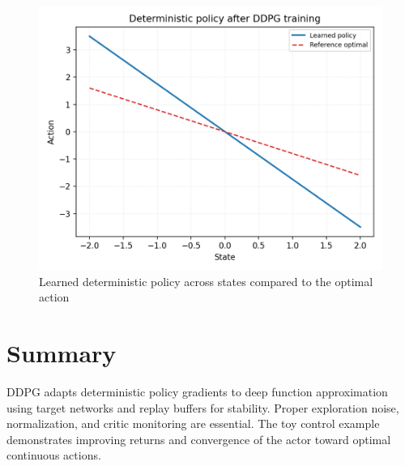 ﻿\documentclass[12pt]{article}
\begin{document}
\begin{figure}[H]
  \centering
  \includegraphics[width=0.82\linewidth]{ddpg_policy_trace.png}
  \caption{Learned deterministic policy across states compared to the optimal action}
  \label{fig:ddpg_policy_trace}
\end{figure}

\FloatBarrier
\section{Summary}
DDPG adapts deterministic policy gradients to deep function approximation using target networks and replay buffers for stability. Proper exploration noise, normalization, and critic monitoring are essential. The toy control example demonstrates improving returns and convergence of the actor toward optimal continuous actions.
\end{document}

